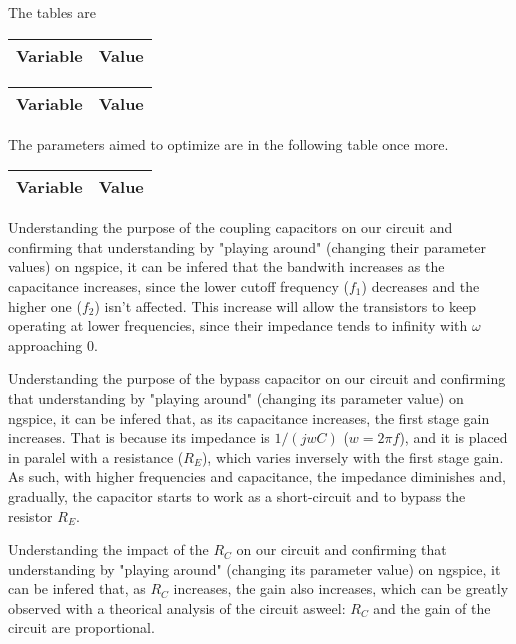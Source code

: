 \clearpage

The tables are 

\begin{center}
    \begin{tabular}{|l|r|}
      \hline    
      {\bf Variable} & {\bf Value} \\ \hline
      
    \end{tabular}
\end{center}

\begin{center}
    \begin{tabular}{|l|r|}
    \hline    
    {\bf Variable} & {\bf Value} \\ \hline
    
    \end{tabular}
\end{center}

The parameters aimed to optimize are in the following table once more.

\begin{center}
    \begin{tabular}{|l|r|}
      \hline    
      {\bf Variable} & {\bf Value} \\ \hline
      
    \end{tabular}
\end{center}

Understanding the purpose of the coupling capacitors on our circuit and confirming that understanding by "playing around" (changing their parameter values) on ngspice, it can be infered that the bandwith increases as the capacitance increases, since the lower cutoff frequency ($f_1$) decreases and the higher one ($f_2$) isn't affected. This increase will allow the transistors to keep operating at lower frequencies, since their impedance tends to infinity with $\omega$ approaching 0.

Understanding the purpose of the bypass capacitor on our circuit and confirming that understanding by "playing around" (changing its parameter value) on ngspice, it can be infered that, as its capacitance increases, the first stage gain increases. That is because its impedance is $1/(jwC)$ ($w=2 \pi f$), and it is placed in paralel with a resistance ($R_E$), which varies inversely with the first stage gain. As such, with higher frequencies and capacitance, the impedance diminishes and, gradually, the capacitor starts to work as a short-circuit and to bypass the resistor $R_E$.

Understanding the impact of the $R_C$ on our circuit and confirming that understanding by "playing around" (changing its parameter value) on ngspice, it can be infered that, as $R_C$ increases, the gain also increases, which can be greatly observed with a theorical analysis of the circuit asweel: $R_C$ and the gain of the circuit are proportional.

